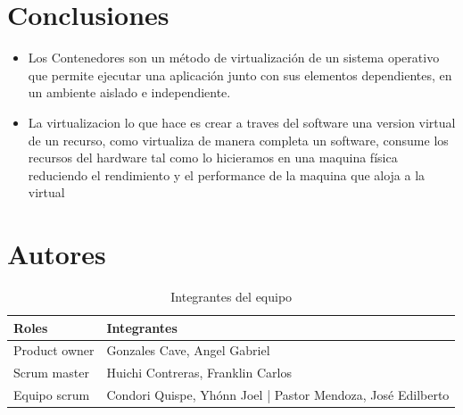 \documentclass[preprint,12pt]{elsarticle}
\begin{document}
\section{Conclusiones}\label{sec:6}


\begin{itemize}
	\item Los Contenedores son un método de virtualización de un sistema operativo que permite ejecutar una aplicación junto con sus elementos dependientes, en un ambiente aislado e independiente.
	\item La virtualizacion lo que hace es crear a traves del software una version virtual de un recurso, como virtualiza de manera completa un software, consume los recursos del hardware tal como lo hicieramos en una maquina física reduciendo el rendimiento y el performance de la maquina que aloja a la virtual
\end{itemize}






\section{Autores}

\begin{table}[htbp]
\begin{center}
\begin{tabular}{|l|l|}
\hline
Roles & Integrantes \\
\hline \hline
Product owner & Gonzales Cave, Angel Gabriel \\ \hline
Scrum master & Huichi Contreras, Franklin Carlos  \\ \hline
Equipo scrum & Condori Quispe, Yhónn Joel | Pastor Mendoza, José Edilberto \\ \hline
\end{tabular}
\caption{Integrantes del equipo}
\label{tabla:sencilla}
\end{center}
\end{table}


\end{document}

